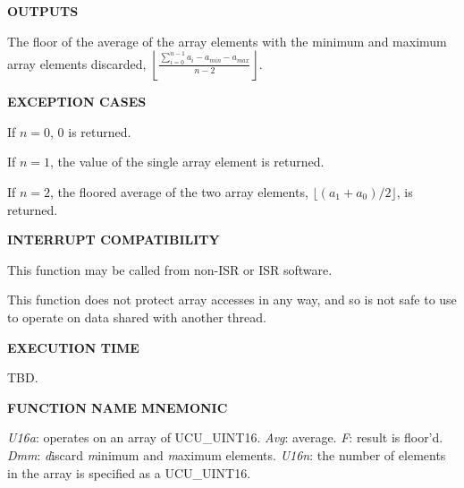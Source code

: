 \noindent\textbf{OUTPUTS}
\begin{list}{}{\setlength{\leftmargin}{0.25in}\setlength{\topsep}{0.0in}}
\item The floor of the average of the array elements with the
      minimum and maximum array elements discarded,
      $\displaystyle{\left\lfloor{\frac{\sum_{i=0}^{n-1}a_i - a_{min} - a_{max}}{n-2}}\right\rfloor}$.
\end{list}
\vspace{2.8ex}

\noindent\textbf{EXCEPTION CASES}
\begin{list}{}{\setlength{\leftmargin}{0.25in}\setlength{\topsep}{0.0in}}
\item If $n = 0$, 0 is returned.
\item If $n = 1$, the value of the single array element is returned.
\item If $n = 2$, the floored average of the two array elements,
      $\lfloor (a_1 + a_0)/2 \rfloor$, is returned.
\end{list}
\vspace{2.8ex}

\noindent\textbf{INTERRUPT COMPATIBILITY}
\begin{list}{}{\setlength{\leftmargin}{0.25in}\setlength{\topsep}{0.0in}}
\item This function may be called from non-ISR or ISR software.
\item This function does not protect array accesses in any way, and so
      is not safe to use to operate on data shared with another thread.
\end{list}
\vspace{2.8ex}

\noindent\textbf{EXECUTION TIME}
\begin{list}{}{\setlength{\leftmargin}{0.25in}\setlength{\topsep}{0.0in}}
\item TBD.
\end{list}
\vspace{2.8ex}

\noindent\textbf{FUNCTION NAME MNEMONIC}
\begin{list}{}{\setlength{\leftmargin}{0.25in}\setlength{\topsep}{0.0in}}
\item \emph{U16a}:   operates on an array of UCU\_UINT16.
      \emph{Avg}:    average.
      \emph{F}:      result is floor'd.
      \emph{Dmm}:    \emph{d}iscard \emph{m}inimum and \emph{m}aximum elements.
      \emph{U16n}:   the number of elements in the array is specified
                     as a UCU\_UINT16.
\end{list}


